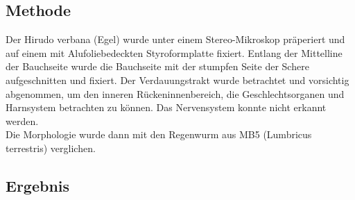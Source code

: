 \documentclass[oneside,10pt,a4paper]{report}
\begin{document}
				
			\subsection{Methode}
				Der Hirudo verbana (Egel) wurde unter einem Stereo-Mikroskop präperiert und auf einem mit Alufoliebedeckten Styroformplatte fixiert. Entlang der Mittelline der Bauchseite wurde die Bauchseite mit der stumpfen Seite der Schere aufgeschnitten und fixiert. Der Verdauungstrakt wurde betrachtet und vorsichtig abgenommen, um den inneren Rückeninnenbereich, die Geschlechtsorganen und Harnsystem betrachten zu können. Das Nervensystem konnte nicht erkannt werden.\\
				Die Morphologie wurde dann mit den Regenwurm aus MB5 (Lumbricus terrestris) verglichen.
			\subsection{Ergebnis}
				
\end{document}
